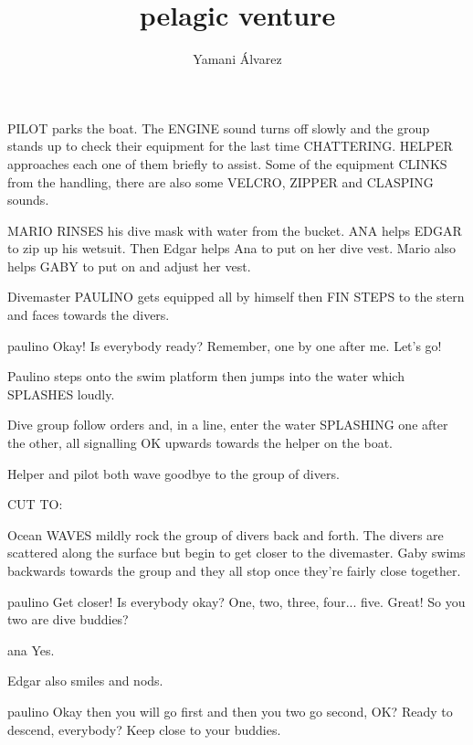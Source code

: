 \documentclass{screenplay}
\title{pelagic venture}
\author{Yamani Álvarez}
\begin{document}
\coverpage
\fadein

PILOT parks the boat. The ENGINE sound turns off slowly and the group stands up to check their equipment for the last time CHATTERING.
HELPER approaches each one of them briefly to assist. Some of the equipment CLINKS from the handling, there are also some VELCRO, ZIPPER and CLASPING sounds.

MARIO RINSES his dive mask with water from the bucket. ANA helps EDGAR to zip up his wetsuit. Then Edgar helps Ana to put on her dive vest. Mario also helps GABY to put on and adjust her vest.

Divemaster PAULINO gets equipped all by himself then FIN STEPS to the stern and faces towards the divers. 

\begin{dialogue}{paulino}
Okay! Is everybody ready? Remember, one by one after me. Let’s go!
\end{dialogue}

Paulino steps onto the swim platform then jumps into the water which SPLASHES loudly.

Dive group follow orders and, in a line, enter the water SPLASHING one after the other, all signalling OK upwards towards the helper on the boat.

Helper and pilot both wave goodbye to the group of divers.

CUT TO:

Ocean WAVES mildly rock the group of divers back and forth. The divers are scattered along the surface but begin to get closer to the divemaster. Gaby swims backwards towards the group and they all stop once they're fairly close together.

\begin{dialogue}{paulino}
Get closer! Is everybody okay? One, two, three, four... five. Great! So you two are dive buddies?
\end{dialogue}

\begin{dialogue}{ana}
Yes.
\end{dialogue}

Edgar also smiles and nods.

\begin{dialogue}{paulino}
Okay then you will go first and then you two go second, OK? Ready to descend, everybody? Keep close to your buddies.
\end{dialogue}
\end{document}

